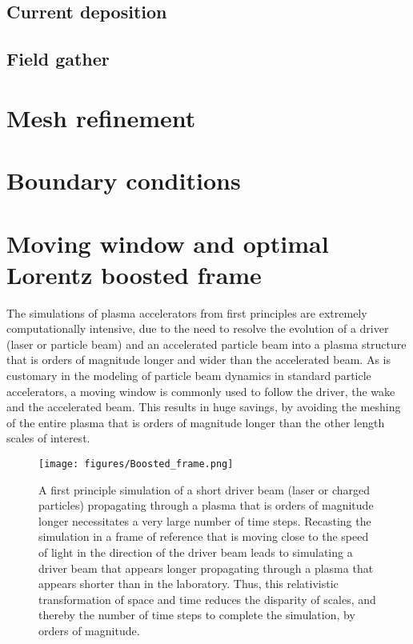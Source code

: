 \documentclass[]{report}
\begin{document}
\subsection{Current deposition}


\subsection{Field gather}


\section{Mesh refinement}


\section{Boundary conditions}


\section{Moving window and optimal Lorentz boosted frame}
The simulations of plasma accelerators from first principles are extremely computationally intensive, due to the need to resolve the evolution of a driver (laser or particle beam) and an accelerated particle beam into a plasma structure that is orders of magnitude longer and wider than the accelerated beam. As is customary in the modeling of particle beam dynamics in standard particle accelerators, a moving window is commonly used to follow the driver, the wake and the accelerated beam. This results in huge savings, by avoiding the meshing of the entire plasma that is orders of magnitude longer than the other length scales of interest. 

\begin{figure}
\texttt{[image: figures/Boosted\_frame.png]}
\caption{\label{fig:PIC} A first principle simulation of a short driver beam (laser or charged particles) propagating through a plasma that is orders of magnitude longer necessitates a very large number of time steps. Recasting the simulation in a frame of reference that is moving close to the speed of light in the direction of the driver beam leads to simulating a driver beam that appears longer propagating through a plasma that appears shorter than in the laboratory. Thus, this relativistic transformation of space and time reduces the disparity of scales, and thereby the number of time steps to complete the simulation, by orders of magnitude.}
\end{figure}
\end{document}
